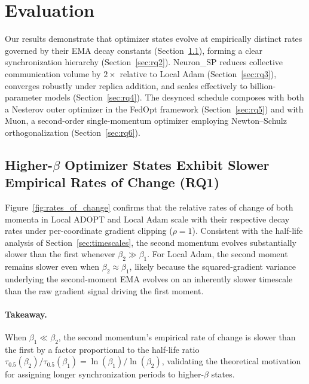 \documentclass{article}
\begin{document}




\section{Evaluation}
\label{sec:evaluation}

Our results demonstrate that optimizer states evolve at empirically
distinct rates governed by their EMA decay constants
(Section~\ref{sec:rq1}), forming a clear synchronization hierarchy
(Section~\ref{sec:rq2}). Neuron\_SP reduces collective communication
volume by $2\times$ relative to Local Adam
(Section~\ref{sec:rq3}), converges robustly under replica addition,
and scales effectively to billion-parameter models
(Section~\ref{sec:rq4}). The desynced schedule composes with both a
Nesterov outer optimizer in the FedOpt framework
(Section~\ref{sec:rq5}) and with Muon, a second-order
single-momentum optimizer employing Newton--Schulz orthogonalization
(Section~\ref{sec:rq6}).

\subsection{Higher-$\beta$ Optimizer States Exhibit Slower Empirical
Rates of Change (RQ1)}
\label{sec:rq1}

Figure~\ref{fig:rates_of_change} confirms that the relative rates of
change of both momenta in Local ADOPT and Local Adam scale with their
respective decay rates under per-coordinate gradient clipping
($\rho = 1$). Consistent with the half-life analysis of
Section~\ref{sec:timescales}, the second momentum evolves substantially
slower than the first whenever $\beta_2 \gg \beta_1$. For Local Adam,
the second moment remains slower even when $\beta_2 \approx \beta_1$,
likely because the squared-gradient variance underlying the second-moment
EMA evolves on an inherently slower timescale than the raw gradient
signal driving the first moment.

\paragraph{Takeaway.}
When $\beta_1 \ll \beta_2$, the second momentum's empirical rate of change
is slower than the first by a factor proportional to the half-life ratio
$\tau_{0.5}(\beta_2)/\tau_{0.5}(\beta_1) = \ln(\beta_1)/\ln(\beta_2)$,
validating the theoretical motivation for assigning longer synchronization
periods to higher-$\beta$ states.
\end{document}

